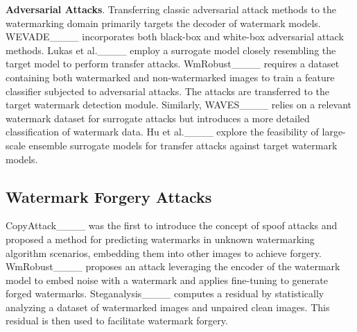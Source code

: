 \textbf{Adversarial Attacks}. Transferring classic adversarial attack methods to the watermarking domain primarily targets the decoder of watermark models. WEVADE____ incorporates both black-box and white-box adversarial attack methods. Lukas et al.____ employ a surrogate model closely resembling the target model to perform transfer attacks. WmRobust____ requires a dataset containing both watermarked and non-watermarked images to train a feature classifier subjected to adversarial attacks. The attacks are transferred to the target watermark detection module. Similarly, WAVES____ relies on a relevant watermark dataset for surrogate attacks but introduces a more detailed classification of watermark data. Hu et al.____ explore the feasibility of large-scale ensemble surrogate models for transfer attacks against target watermark models.

\subsection{Watermark Forgery Attacks}
CopyAttack____ was the first to introduce the concept of spoof attacks and proposed a method for predicting watermarks in unknown watermarking algorithm scenarios, embedding them into other images to achieve forgery. WmRobust____ proposes an attack leveraging the encoder of the watermark model to embed noise with a watermark and applies fine-tuning to generate forged watermarks. Steganalysis____ computes a residual by statistically analyzing a dataset of watermarked images and unpaired clean images. This residual is then used to facilitate watermark forgery.